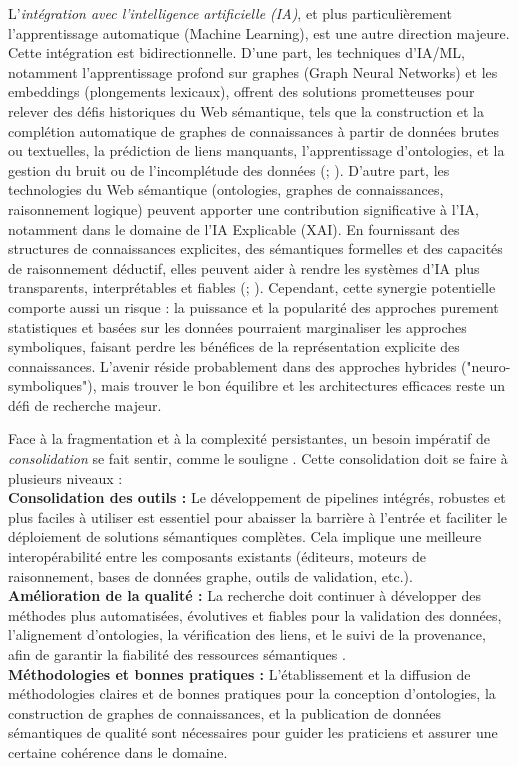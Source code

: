 \documentclass[9pt,twocolumn,twoside,french]{opticajnl}
\begin{document}
L'\textit{intégration avec l'intelligence artificielle (IA)}, et plus particulièrement l'apprentissage automatique (Machine Learning), est une autre direction majeure. Cette intégration est bidirectionnelle. D'une part, les techniques d'IA/ML, notamment l'apprentissage profond sur graphes (Graph Neural Networks) et les embeddings (plongements lexicaux), offrent des solutions prometteuses pour relever des défis historiques du Web sémantique, tels que la construction et la complétion automatique de graphes de connaissances à partir de données brutes ou textuelles, la prédiction de liens manquants, l'apprentissage d'ontologies, et la gestion du bruit ou de l'incomplétude des données (\citealp{d'Amato2024Knowledge}; \citealp{Hitzler2021}). D'autre part, les technologies du Web sémantique (ontologies, graphes de connaissances, raisonnement logique) peuvent apporter une contribution significative à l'IA, notamment dans le domaine de l'IA Explicable (XAI). En fournissant des structures de connaissances explicites, des sémantiques formelles et des capacités de raisonnement déductif, elles peuvent aider à rendre les systèmes d'IA plus transparents, interprétables et fiables (\citealp{Liebig2020}; \citealp{Hitzler2021}). Cependant, cette synergie potentielle comporte aussi un risque : la puissance et la popularité des approches purement statistiques et basées sur les données pourraient marginaliser les approches symboliques, faisant perdre les bénéfices de la représentation explicite des connaissances. L'avenir réside probablement dans des approches hybrides ("neuro-symboliques"), mais trouver le bon équilibre et les architectures efficaces reste un défi de recherche majeur.

Face à la fragmentation et à la complexité persistantes, un besoin impératif de \textit{consolidation} se fait sentir, comme le souligne \citet{Hitzler2021}. Cette consolidation doit se faire à plusieurs niveaux : \\
\textbf{Consolidation des outils :} Le développement de pipelines intégrés, robustes et plus faciles à utiliser est essentiel pour abaisser la barrière à l'entrée et faciliter le déploiement de solutions sémantiques complètes. Cela implique une meilleure interopérabilité entre les composants existants (éditeurs, moteurs de raisonnement, bases de données graphe, outils de validation, etc.). \\
\textbf{Amélioration de la qualité :} La recherche doit continuer à développer des méthodes plus automatisées, évolutives et fiables pour la validation des données, l'alignement d'ontologies, la vérification des liens, et le suivi de la provenance, afin de garantir la fiabilité des ressources sémantiques \citep{Martinez-Rodriguez2020Information}. \\
\textbf{Méthodologies et bonnes pratiques :} L'établissement et la diffusion de méthodologies claires et de bonnes pratiques pour la conception d'ontologies, la construction de graphes de connaissances, et la publication de données sémantiques de qualité sont nécessaires pour guider les praticiens et assurer une certaine cohérence dans le domaine.
\end{document}
